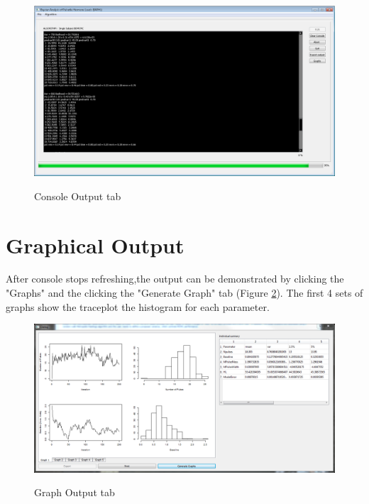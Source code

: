 \documentclass[11pt]{book}
\begin{document}
\begin{figure}
  \centering
  \includegraphics[width=\textwidth]{consoleoutput.PNG}\\
  \caption{Console Output tab}\label{console}
\end{figure}

\section{Graphical Output}
After console stops refreshing,the output can be demonstrated by clicking the "Graphs"  and the clicking the "Generate Graph" tab  (Figure \ref{graph}). The first 4 sets of graphs show the traceplot the histogram for each parameter.

\begin{figure}
  \centering
  \includegraphics[width=\textwidth]{grapho.PNG}\\
  \caption{Graph Output tab}\label{graph}
\end{figure}
\end{document}
